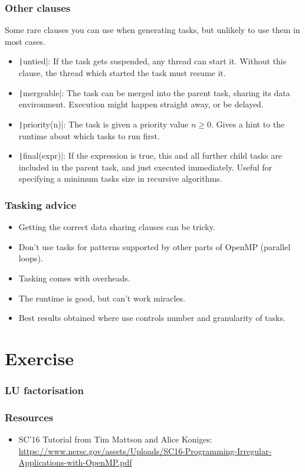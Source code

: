 \documentclass{beamer}
\begin{document}
\begin{frame}
\frametitle{Other clauses}
Some rare clauses you can use when generating tasks, but unlikely to use them in most cases.
\begin{itemize}
  \item \texttt|untied|: If the task gets suspended, any thread can start it. Without this clause, the thread which started the task must resume it.
  \item \texttt|mergeable|: The task can be merged into the parent task, sharing its data environment. Execution might happen straight away, or be delayed.
  \item \texttt|priority(n)|: The task is given a priority value $n \ge 0$. Gives a hint to the runtime about which tasks to run first.
  \item \texttt|final(expr)|: If the expression is true, this and all further child tasks are included in the parent task, and just executed immediately. Useful for specifying a minimum tasks size in recursive algorithms.
\end{itemize}
\end{frame}
\begin{frame}
\frametitle{Tasking advice}
\begin{itemize}
  \item Getting the correct data sharing clauses can be tricky.
  \item Don't use tasks for patterns supported by other parts of OpenMP (parallel loops).
  \item Tasking comes with overheads.
  \item The runtime is good, but can't work miracles.
  \item Best results obtained where use controls number and granularity of tasks.
\end{itemize}
\end{frame}

\section{Exercise}
\begin{frame}
\frametitle{LU factorisation}
\end{frame}

\begin{frame}
\frametitle{Resources}
\begin{itemize}
  \item SC'16 Tutorial from Tim Mattson and Alice Koniges: \url{https://www.nersc.gov/assets/Uploads/SC16-Programming-Irregular-Applications-with-OpenMP.pdf}
\end{itemize}
\end{frame}
\end{document}
